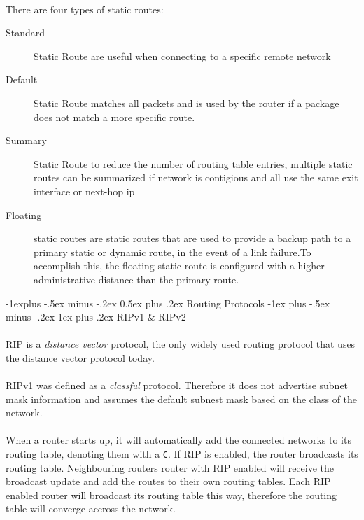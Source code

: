 \documentclass[10pt,landscape]{article}
\makeatletter
\renewcommand{\subsection}{\@startsection{subsection}{2}{0mm}%
                                {-1explus -.5ex minus -.2ex}%
                                {0.5ex plus .2ex}%
                                {\normalfont\normalsize\bfseries}}
\renewcommand{\subsubsection}{\@startsection{subsubsection}{3}{0mm}%
                                {-1ex plus -.5ex minus -.2ex}%
                                {1ex plus .2ex}%
                                {\normalfont\small\bfseries}}
\makeatother
\begin{document}
\begin{multicols}{3}
\paragraph{}
There are four types of static routes:
\begin{description}
	\item[Standard] Static Route are useful when connecting to a specific remote network
	\item[Default]  Static Route matches all packets and is used by the router if a package does not match a more specific route.
	\item[Summary] Static Route to reduce the number of routing table entries, multiple static routes can be summarized if network is contigious and all use the same exit interface or next-hop ip
	\item[Floating] static routes are static routes that are used to provide a backup path to a primary static or dynamic route, in the event of a link failure.To accomplish this, the floating static route is configured with a higher administrative distance than the primary route.
\end{description}
\subsection{Routing Protocols}
\subsubsection{RIPv1 \& RIPv2}
\paragraph{}
RIP is a \textit{distance vector} protocol, the only widely used routing protocol that uses the distance vector protocol today.
\paragraph{}
RIPv1 was defined as a \textit{classful} protocol. Therefore it does not advertise subnet mask information and assumes the default subnest mask based on the class of the network.
\paragraph{}
When a router starts up, it will automatically add the connected networks to its routing table, denoting them with a \verb!C!.
If RIP is enabled, the router broadcasts its routing table. Neighbouring routers router with RIP enabled will receive the broadcast update and add the routes to their own routing tables.
Each RIP enabled router will broadcast its routing table this way, therefore the routing table will converge accross the network.

\end{multicols}
\end{document}
